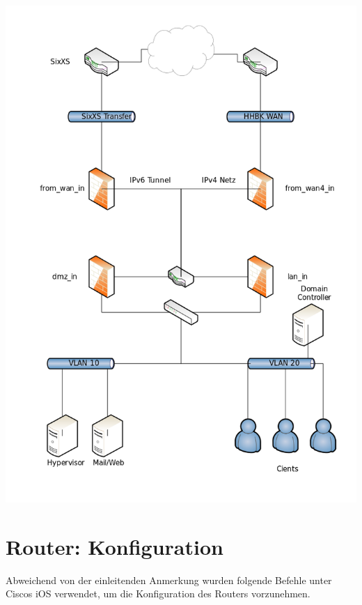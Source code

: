 \includegraphics[scale=0.5]{8gruppe_dokumentation_pictures/02_JahresProjekt_Netzwerkplan.png}
\label{realisiertes_netzwerk}
\newpage
\section{Router: Konfiguration}

Abweichend von der einleitenden Anmerkung wurden folgende Befehle unter Ciscos iOS verwendet, um die Konfiguration des Routers vorzunehmen.

